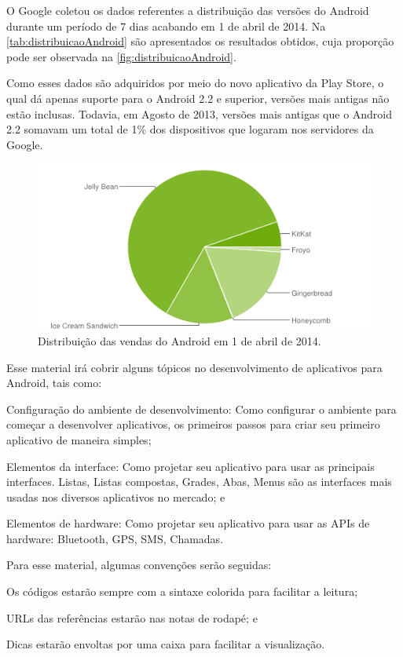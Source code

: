 \documentclass[a4paper,12pt,brazil,oneside]{book}
\begin{document}
O Google coletou os dados referentes a distribuição das versões do Android durante um período de 7 dias acabando em 1 de abril de 2014. Na \autoref{tab:distribuicaoAndroid} são apresentados os resultados obtidos, cuja proporção pode ser observada na \autoref{fig:distribuicaoAndroid}. 

Como esses dados são adquiridos por meio do novo aplicativo da Play Store, o qual dá apenas suporte para o Android 2.2 e superior, versões mais antigas não estão inclusas. Todavia, em Agosto de 2013, versões mais antigas que o Android 2.2 somavam um total de 1\% dos dispositivos que logaram nos servidores da Google.

\begin{figure}[H]
  \centering
  \includegraphics[width=.75\textwidth]{figuras/introducao/chart.png}
  \caption{Distribuição das vendas do Android em 1 de abril de 2014.}
  \label{fig:distribuicaoAndroid}
\end{figure}

Esse material irá cobrir alguns tópicos no desenvolvimento de aplicativos para Android, tais como:
\bi
  \item Configuração do ambiente de desenvolvimento: Como configurar o ambiente para começar a desenvolver aplicativos, os primeiros passos para criar seu primeiro aplicativo de maneira simples;
  \item Elementos da interface: Como projetar seu aplicativo para usar as principais interfaces. Listas, Listas compostas, Grades, Abas, Menus são as interfaces mais usadas nos diversos aplicativos no mercado; e
  \item Elementos de hardware: Como projetar seu aplicativo para usar as APIs de hardware: Bluetooth, GPS, SMS, Chamadas.
\ei

Para esse material, algumas convenções serão seguidas: 
\bi
  \item Os códigos estarão sempre com a sintaxe colorida para facilitar a leitura;
  \item URLs das referências estarão nas notas de rodapé; e
  \item Dicas estarão envoltas por uma caixa para facilitar a visualização.
\ei
\end{document}
